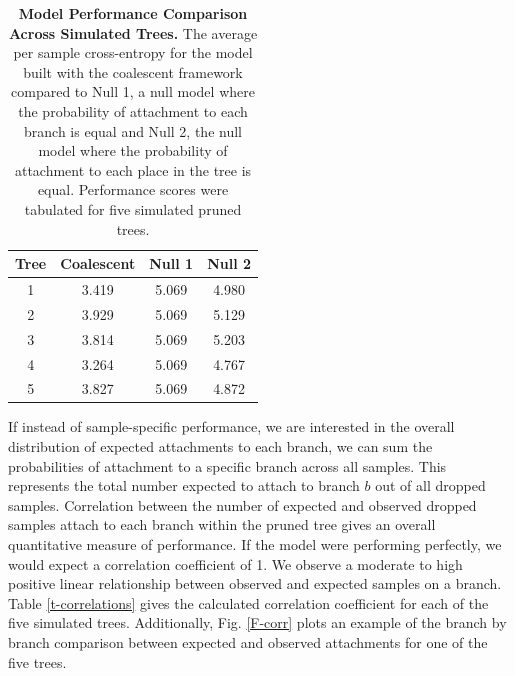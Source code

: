 \documentclass[11pt,oneside,letterpaper]{article}
\newcommand\tab[1][1cm]{\hspace*{#1}}
\begin{document}
\begin{table}[h]
\centering
\begin{tabular}{cccc}
\hline
Tree & Coalescent & Null 1 & Null 2\\ \hline
1    & 3.419     & 5.069 & 4.980\\
2    & 3.929     & 5.069 & 5.129 \\
3    & 3.814    & 5.069 & 5.203 \\
4    & 3.264   & 5.069 & 4.767 \\
5    & 3.827     & 5.069 & 4.872 \\ \hline
\end{tabular}
\caption{\textbf{Model Performance Comparison Across Simulated Trees.}
	The average per sample cross-entropy for the model built with the coalescent framework compared to Null 1, a null model where the probability of attachment to each branch is equal and Null 2, the null model where the probability of attachment to each place in the tree is equal. Performance scores were tabulated for five simulated pruned trees.
	}
\label{t-entropy}
\end{table}

\tab If instead of sample-specific performance, we are interested in the overall distribution of expected attachments to each branch, we can sum the probabilities of attachment to a specific branch across all samples. This represents the total number expected to attach to branch $b$ out of all dropped samples. Correlation between the number of expected and observed dropped samples attach to each branch within the pruned tree gives an overall quantitative measure of performance. If the model were performing perfectly, we would expect a correlation coefficient of 1. We observe a moderate to high positive linear relationship between observed and expected samples on a branch. Table \ref{t-correlations} gives the calculated correlation coefficient for each of the five simulated trees. Additionally, Fig. \ref{F-corr} plots an example of the branch by branch comparison between expected and observed attachments for one of the five trees.
\end{document}
